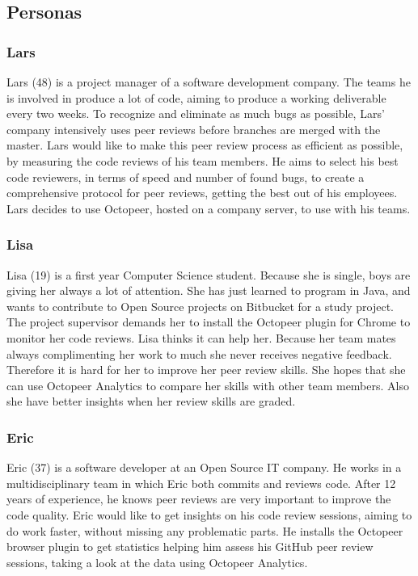 \documentclass{article}
\begin{document}
\subsection{Personas} \label{section:personas}
\subsubsection{Lars}  \label{persona:lars}
Lars (48) is a project manager of a software development company. The teams he is involved in produce a lot of code, aiming to produce a working deliverable every two weeks. To recognize and eliminate as much bugs as possible, Lars' company intensively uses peer reviews before branches are merged with the master. Lars would like to make this peer review process as efficient as possible, by measuring the code reviews of his team members. He aims to select his best code reviewers, in terms of speed and number of found bugs, to create a comprehensive protocol for peer reviews, getting the best out of his employees. Lars decides to use Octopeer, hosted on a company server, to use with his teams.

\subsubsection{Lisa}
Lisa (19) is a first year Computer Science student. Because she is single, boys are giving her always a lot of attention. She has just learned to program in Java, and wants to contribute to Open Source projects on Bitbucket for a study project. The project supervisor demands her to install the Octopeer plugin for Chrome to monitor her code reviews. Lisa thinks it can help her. Because her team mates always complimenting her work to much she never receives negative feedback. Therefore it is hard for her to improve her peer review skills. She hopes that she can use Octopeer Analytics to compare her skills with other team members. Also she have better insights when her review skills are graded.

\subsubsection{Eric}
Eric (37) is a software developer at an Open Source IT company. He works in a multidisciplinary team in which Eric both commits and reviews code. After 12 years of experience, he knows peer reviews are very important to improve the code quality. Eric would like to get insights on his code review sessions, aiming to do work faster, without missing any problematic parts. He installs the Octopeer browser plugin to get statistics helping him assess his GitHub peer review sessions, taking a look at the data using Octopeer Analytics.
\end{document}
